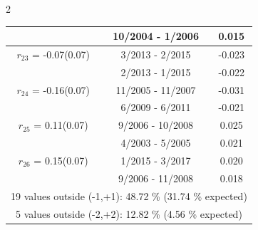 \begin{multicols}{2}
{\begin{tabular}{ccc}
&       10/2004 -  1/2006 &        0.015  \vspace{-.02in} \\ \hline 
  $r_{23}$ = -0.07(0.07) &       3/2013 -  2/2015 &       -0.023    \vspace{-.10in} \\ 
  &        2/2013 -  1/2015 &       -0.022  \vspace{-.02in}   \\ \hline 
    $r_{24}$ = -0.16(0.07) &      11/2005 - 11/2007 &       -0.031    \vspace{-.10in} \\ 
  &        6/2009 -  6/2011 &       -0.021  \vspace{-.02in}   \\ \hline 
    $r_{25}$ = 0.11(0.07) &       9/2006 - 10/2008 &        0.025   \vspace{-.10in} \\  
&        4/2003 -  5/2005 &        0.021  \vspace{-.02in} \\ \hline 
  $r_{26}$ = 0.15(0.07) &       1/2015 -  3/2017 &        0.020   \vspace{-.10in} \\  
&        9/2006 - 11/2008 &        0.018  \vspace{-.02in} \\ \hline 
\multicolumn{3}{c}{              19 values outside (-1,+1): 48.72  \% (31.74  \% expected)}\vspace{-.10in} \\ 
\multicolumn{3}{c}{               5 values outside (-2,+2): 12.82 \%  (4.56 \% expected) } \\
 \end{tabular} \\ 
 } 
\end{multicols} 
